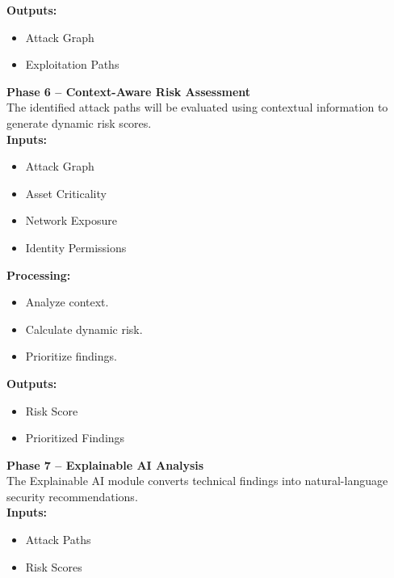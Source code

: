 \textbf{Outputs:}

\begin{itemize}
\tightlist
\item
  Attack Graph\\
\item
  Exploitation Paths
\end{itemize}

\textbf{Phase 6 -- Context-Aware Risk Assessment}\\
The identified attack paths will be evaluated using contextual information to generate dynamic risk scores.\\
\textbf{Inputs:}

\begin{itemize}
\tightlist
\item
  Attack Graph\\
\item
  Asset Criticality\\
\item
  Network Exposure\\
\item
  Identity Permissions
\end{itemize}

\textbf{Processing:}

\begin{itemize}
\tightlist
\item
  Analyze context.\\
\item
  Calculate dynamic risk.\\
\item
  Prioritize findings.
\end{itemize}

\textbf{Outputs:}

\begin{itemize}
\tightlist
\item
  Risk Score\\
\item
  Prioritized Findings
\end{itemize}

\textbf{Phase 7 -- Explainable AI Analysis}\\
The Explainable AI module converts technical findings into natural-language security recommendations.\\
\textbf{Inputs:}

\begin{itemize}
\tightlist
\item
  Attack Paths\\
\item
  Risk Scores
\end{itemize}

